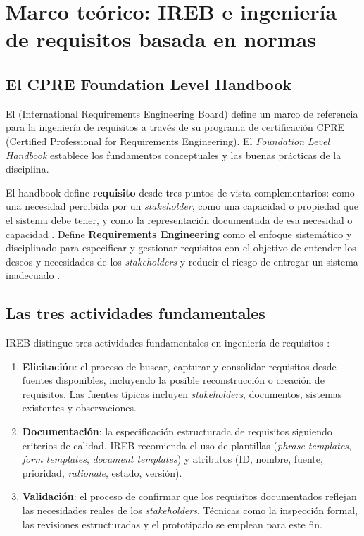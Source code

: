 \section{Marco te\'orico: IREB e ingenier\'ia de requisitos basada en normas}
\label{sec:marco-ireb}

\subsection{El CPRE Foundation Level Handbook}

El \ireb{} (International Requirements Engineering Board) define un marco de referencia para la ingenier\'ia de requisitos a trav\'es de su programa de certificaci\'on CPRE (Certified Professional for Requirements Engineering). El \textit{Foundation Level Handbook} \cite{cpre} establece los fundamentos conceptuales y las buenas pr\'acticas de la disciplina.

El handbook define \textbf{requisito} desde tres puntos de vista complementarios: como una necesidad percibida por un \emph{stakeholder}, como una capacidad o propiedad que el sistema debe tener, y como la representaci\'on documentada de esa necesidad o capacidad \cite[p.~10]{cpre}. Define \textbf{Requirements Engineering} como el enfoque sistem\'atico y disciplinado para especificar y gestionar requisitos con el objetivo de entender los deseos y necesidades de los \emph{stakeholders} y reducir el riesgo de entregar un sistema inadecuado \cite[pp.~10--11]{cpre}.

\subsection{Las tres actividades fundamentales}

IREB distingue tres actividades fundamentales en ingenier\'ia de requisitos \cite[pp.~16--28]{cpre}:

\begin{enumerate}
    \item \textbf{Elicitaci\'on}: el proceso de buscar, capturar y consolidar requisitos desde fuentes disponibles, incluyendo la posible reconstrucci\'on o creaci\'on de requisitos. Las fuentes t\'ipicas incluyen \emph{stakeholders}, documentos, sistemas existentes y observaciones.
    \item \textbf{Documentaci\'on}: la especificaci\'on estructurada de requisitos siguiendo criterios de calidad. IREB recomienda el uso de plantillas (\emph{phrase templates}, \emph{form templates}, \emph{document templates}) y atributos (ID, nombre, fuente, prioridad, \emph{rationale}, estado, versi\'on).
    \item \textbf{Validaci\'on}: el proceso de confirmar que los requisitos documentados reflejan las necesidades reales de los \emph{stakeholders}. T\'ecnicas como la inspecci\'on formal, las revisiones estructuradas y el prototipado se emplean para este fin.
\end{enumerate}

